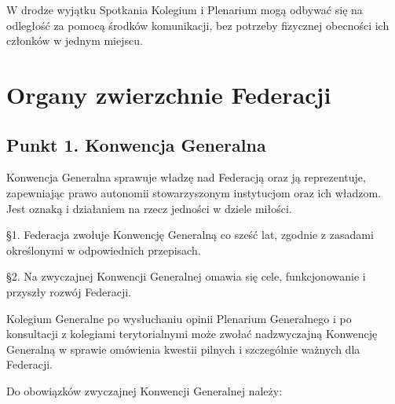 

 W drodze wyjątku Spotkania Kolegium i Plenarium mogą odbywać się na odległość za pomocą środków komunikacji, bez potrzeby fizycznej obecności ich członków w jednym miejscu.
 
\chapter{Organy zwierzchnie Federacji}
 
\section{Punkt 1. Konwencja Generalna}




 Konwencja Generalna sprawuje władzę nad Federacją oraz ją reprezentuje, zapewniając prawo autonomii stowarzyszonym instytucjom oraz ich władzom. Jest oznaką i działaniem na rzecz jedności w dziele miłości.
 


 \S{}1. Federacja zwołuje Konwencję Generalną co sześć lat, zgodnie z zasadami określonymi w odpowiednich przepisach.




\S{}2. Na zwyczajnej  Konwencji Generalnej omawia się cele, funkcjonowanie i przyszły rozwój Federacji.






 Kolegium Generalne po wysłuchaniu opinii Plenarium Generalnego i po konsultacji z kolegiami terytorialnymi może zwołać nadzwyczajną Konwencję Generalną w sprawie omówienia kwestii pilnych i szczególnie ważnych dla Federacji.




 Do obowiązków zwyczajnej Konwencji Generalnej należy:


